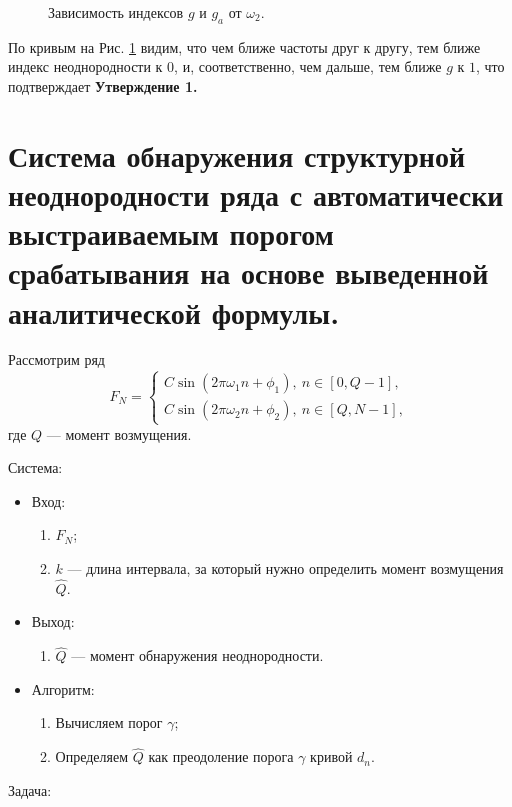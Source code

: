 \documentclass[specialist, substylefile = spbu.rtx,
			   subf, href, 12pt]{disser}
\begin{document}
\begin{figure}[!hhh]
	\caption{Зависимость индексов $ g $ и $ g_a $ от $ \omega_2 $.}
	\label{pic:g_c_vs_g_a_from_w_2}
\end{figure}

По кривым на Рис. \ref{pic:g_c_vs_g_a_from_w_2} видим, что чем ближе частоты друг к другу, тем ближе индекс неоднородности к $ 0 $, и, соответственно, чем дальше, тем ближе $ g $ к $ 1 $, что подтверждает \textbf{Утверждение 1.}


\newpage
\chapter{Система обнаружения структурной неоднородности ряда с автоматически выстраиваемым порогом срабатывания на основе выведенной аналитической формулы.}


Рассмотрим ряд 
\begin{equation*} 
	F_N = 
	\begin{cases} 
		C\sin(2\pi\omega_1 n + \phi_1),\ n \in [0, Q-1], \\ 
		C\sin(2\pi\omega_2 n + \phi_2),\ n \in [Q, N-1], 
	\end{cases} 
\end{equation*}
где $ Q $ --- момент возмущения. 


Система: 

\begin{itemize}
	\item Вход:
	\begin{enumerate}
		\item $ F_N $;
		\item $ k $ --- длина интервала, за который нужно определить момент возмущения $ \hat{Q} $.
	\end{enumerate}
	\item Выход:
	\begin{enumerate}
		\item $ \hat{Q} $ --- момент обнаружения неоднородности.
	\end{enumerate}
	\item Алгоритм:
	\begin{enumerate}
		\item Вычисляем порог $ \gamma $;
		\item Определяем $ \hat{Q} $ как преодоление порога $ \gamma $ кривой $ d_n $.
	\end{enumerate}
\end{itemize}
Задача:
\end{document}
